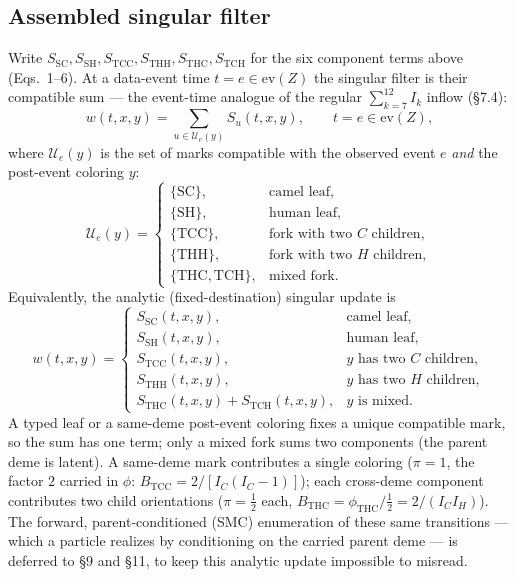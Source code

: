 \documentclass[11pt]{article}
\newcommand{\evZ}{\mathrm{ev}(Z)}
\theoremstyle{plain}
\begin{document}
\subsection{Assembled singular filter}
Write $S_{\mathrm{SC}},S_{\mathrm{SH}},S_{\mathrm{TCC}},S_{\mathrm{THH}},S_{\mathrm{THC}},S_{\mathrm{TCH}}$
for the six component terms above (Eqs.~1--6). At a data-event time $t=e\in\evZ$ the singular filter is
their compatible sum --- the event-time analogue of the regular $\sum_{k=7}^{12}I_k$ inflow (\S7.4):
\[
w(t,x,y)=\sum_{u\in\mathcal U_e(y)}S_u(t,x,y),\qquad t=e\in\evZ,
\]
where $\mathcal U_e(y)$ is the set of marks compatible with the observed event $e$ \emph{and} the
post-event coloring $y$:
\[
\mathcal U_e(y)=
\begin{cases}
\{\mathrm{SC}\}, & \text{camel leaf},\\
\{\mathrm{SH}\}, & \text{human leaf},\\
\{\mathrm{TCC}\}, & \text{fork with two $C$ children},\\
\{\mathrm{THH}\}, & \text{fork with two $H$ children},\\
\{\mathrm{THC},\mathrm{TCH}\}, & \text{mixed fork.}
\end{cases}
\]
Equivalently, the analytic (fixed-destination) singular update is
\[
w(t,x,y)=
\begin{cases}
S_{\mathrm{SC}}(t,x,y), & \text{camel leaf},\\
S_{\mathrm{SH}}(t,x,y), & \text{human leaf},\\
S_{\mathrm{TCC}}(t,x,y), & y\text{ has two }C\text{ children},\\
S_{\mathrm{THH}}(t,x,y), & y\text{ has two }H\text{ children},\\
S_{\mathrm{THC}}(t,x,y)+S_{\mathrm{TCH}}(t,x,y), & y\text{ is mixed.}
\end{cases}
\]
A typed leaf or a same-deme post-event coloring fixes a unique compatible mark, so the sum has one term;
only a mixed fork sums two components (the parent deme is latent). A same-deme mark contributes a single
coloring ($\pi=1$, the factor $2$ carried in $\phi$: $B_{\mathrm{TCC}}=2/[I_C(I_C-1)]$); each cross-deme
component contributes two child orientations ($\pi=\tfrac12$ each,
$B_{\mathrm{THC}}=\phi_{\mathrm{THC}}/\tfrac12=2/(I_CI_H)$). The forward, parent-conditioned (SMC)
enumeration of these same transitions --- which a particle realizes by conditioning on the carried parent
deme --- is deferred to \S9 and \S11, to keep this analytic update impossible to misread.
\end{document}
